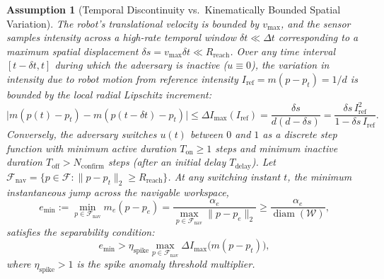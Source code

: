 \documentclass[12pt, a4paper]{article}
\newtheorem{assumption}{Assumption}
\begin{document}
\begin{assumption}[Temporal Discontinuity vs.\ Kinematically Bounded Spatial Variation]
\label{assump:discontinuity}
The robot's translational velocity is bounded by $v_{\max}$, and the sensor samples intensity across a high-rate temporal window $\delta t \ll \Delta t$ corresponding to a maximum spatial displacement $\delta s = v_{\max}\delta t \ll R_{\text{reach}}$. Over any time interval $[t - \delta t, t]$ during which the adversary is inactive ($u \equiv 0$), the variation in intensity due to robot motion from reference intensity $I_{\text{ref}} = m(p - p_t) = 1/d$ is bounded by the local radial Lipschitz increment:
\begin{equation}
    \bigl|m(p(t) - p_t) - m(p(t - \delta t) - p_t)\bigr| \le \Delta I_{\max}(I_{\text{ref}}) = \frac{\delta s}{d(d - \delta s)} = \frac{\delta s\, I_{\text{ref}}^2}{1 - \delta s\, I_{\text{ref}}}.
    \label{eq:lipschitz_bound}
\end{equation}
Conversely, the adversary switches $u(t)$ between $0$ and $1$ as a discrete step function with minimum active duration $T_{\text{on}} \ge 1$ steps and minimum inactive duration $T_{\text{off}} > N_{\text{confirm}}$ steps (after an initial delay $T_{\text{delay}}$). Let $\mathcal{F}_{\text{nav}} = \{p \in \mathcal{F} : \|p - p_t\|_2 \ge R_{\text{reach}}\}$. At any switching instant $t$, the minimum instantaneous jump across the navigable workspace,
\begin{equation}
    e_{\min} := \min_{p \in \mathcal{F}_{\text{nav}}} m_e(p - p_e) = \frac{\alpha_e}{\max_{p \in \mathcal{F}_{\text{nav}}} \|p - p_e\|_2} \ge \frac{\alpha_e}{\operatorname{diam}(\mathcal{W})},
    \label{eq:emin_def}
\end{equation}
satisfies the separability condition:
\begin{equation}
    e_{\min} > \eta_{\text{spike}} \max_{p \in \mathcal{F}_{\text{nav}}} \Delta I_{\max}\!\bigl(m(p - p_t)\bigr),
    \label{eq:detectability_condition}
\end{equation}
where $\eta_{\text{spike}} > 1$ is the spike anomaly threshold multiplier.
\end{assumption}
\end{document}
